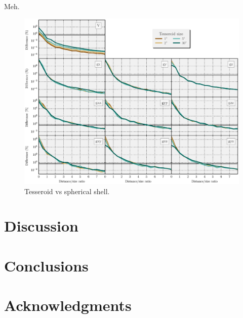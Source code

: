 Meh.

\begin{figure}
    \centering
    \includegraphics[width=\textwidth]{figs/tesseroid-x-shell}
    \caption{
        Tesseroid vs spherical shell.
    }
    \label{fig:tesseroid-x-shell}
\end{figure}

\section{Discussion}

\section{Conclusions}

\section{Acknowledgments}
